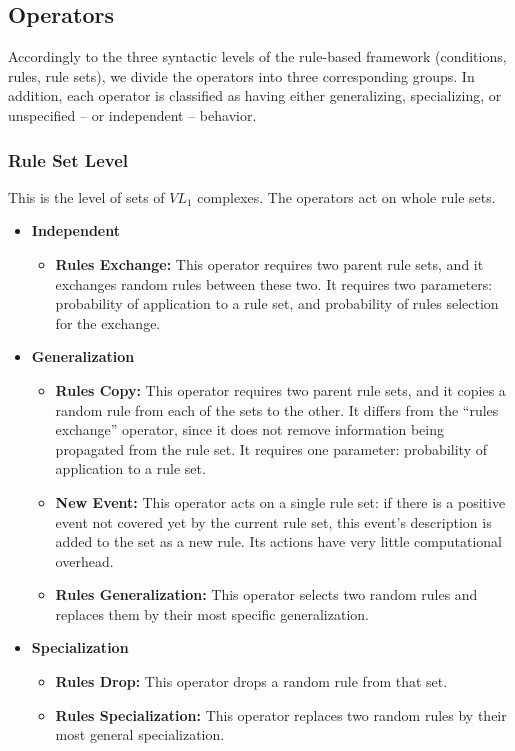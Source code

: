 \documentclass[../main.tex]{subfiles}
\begin{document}
\subsection{Operators}
Accordingly to the three syntactic levels of the rule-based framework (conditions, rules, rule sets), we divide the
operators into three corresponding groups. In addition, each operator is classified as having either generalizing,
specializing, or unspecified -- or independent -- behavior.

\subsubsection{Rule Set Level} This is the level of sets of $VL_1$ complexes. The operators act on whole rule sets.

\begin{itemize}
	\item \textbf{Independent}
	\begin{itemize}
		\item \textbf{Rules Exchange:} This operator requires two parent rule sets, and it exchanges random rules
		between these two. It requires two parameters: probability of application to a rule set, and probability of
		rules selection for the exchange.
	\end{itemize}
	\item \textbf{Generalization}
	\begin{itemize}
		\item \textbf{Rules Copy:} This operator requires two parent rule sets, and it copies a random rule from each
		of the sets to the other. It differs from the ``rules exchange'' operator, since it does not remove information
		being propagated from the rule set. It requires one parameter: probability of application to a rule set.
		\item \textbf{New Event:} This operator acts on a single rule set: if there is a positive event not covered yet
		by the current rule set, this event's description is added to the set as a new rule. Its actions have very
		little computational overhead.
		\item \textbf{Rules Generalization:} This operator selects two random rules and replaces them by their most
specific generalization.
	\end{itemize}
	\item \textbf{Specialization}
	\begin{itemize}
		\item \textbf{Rules Drop:} This operator drops a random rule from that set.
		\item \textbf{Rules Specialization:} This operator replaces two random rules
		by their most general specialization.
	\end{itemize}
\end{itemize}
\end{document}
